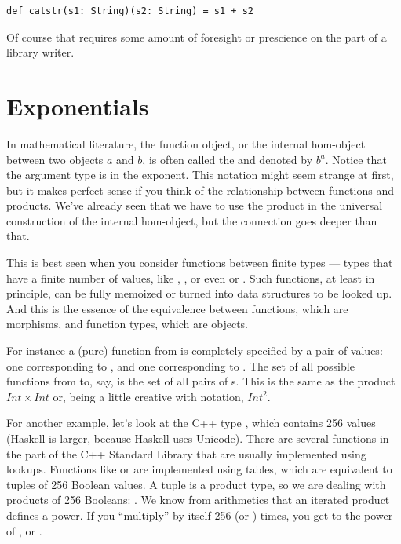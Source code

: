 \begin{Verbatim}
def catstr(s1: String)(s2: String) = s1 + s2
\end{Verbatim}
Of course that requires some amount of foresight or prescience on the
part of a library writer.

\section{Exponentials}\label{exponentials}

In mathematical literature, the function object, or the internal
hom-object between two objects $a$ and $b$, is often
called the  and denoted by $b^{a}$. Notice that
the argument type is in the exponent. This notation might seem strange
at first, but it makes perfect sense if you think of the relationship
between functions and products. We've already seen that we have to use
the product in the universal construction of the internal hom-object,
but the connection goes deeper than that.

This is best seen when you consider functions between finite types ---
types that have a finite number of values, like ,
, or even  or . Such functions,
at least in principle, can be fully memoized or turned into data
structures to be looked up. And this is the essence of the equivalence
between functions, which are morphisms, and function types, which are
objects.

For instance a (pure) function from  is completely
specified by a pair of values: one corresponding to , and
one corresponding to . The set of all possible functions
from  to, say,  is the set of all pairs of
s. This is the same as the product $Int \times Int$ or,
being a little creative with notation, $Int^{2}$.

For another example, let's look at the C++ type , which
contains 256 values (Haskell  is larger, because Haskell
uses Unicode). There are several functions in the part of the
C++ Standard Library that are usually implemented using lookups.
Functions like  or  are implemented
using tables, which are equivalent to tuples of 256 Boolean values. A
tuple is a product type, so we are dealing with products of 256
Booleans: . We know from
arithmetics that an iterated product defines a power. If you
``multiply''  by itself 256 (or ) times, you
get  to the power of , or .


